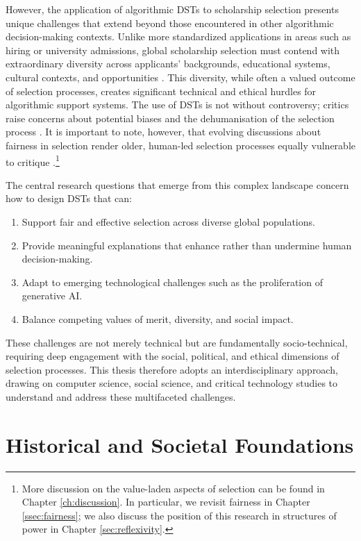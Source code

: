 However, the application of algorithmic DSTs to scholarship selection presents unique challenges that extend beyond those encountered in other algorithmic decision-making contexts. Unlike more standardized applications in areas such as hiring or university admissions, global scholarship selection must contend with extraordinary diversity across applicants' backgrounds, educational systems, cultural contexts, and opportunities \cite{Warikoo_2019}. This diversity, while often a valued outcome of selection processes, creates significant technical and ethical hurdles for algorithmic support systems. The use of DSTs is not without controversy; critics raise concerns about potential biases \cite{dwork_fairness_2012} and the dehumanisation of the selection process \cite{binns_its_2018}. It is important to note, however, that evolving discussions about fairness in selection render older, human-led selection processes equally vulnerable to critique \cite{Ahnaf2023AHPAP,pmlr-v80-kearns18a}.\footnote{More discussion on the value-laden aspects of selection can be found in Chapter \ref{ch:discussion}. In particular, we revisit fairness in Chapter \ref{ssec:fairness}; we also discuss the position of this research in structures of power in Chapter \ref{sec:reflexivity}.}

The central research questions that emerge from this complex landscape concern how to design DSTs that can:
\begin{enumerate}
  \item Support fair and effective selection across diverse global populations.
  \item Provide meaningful explanations that enhance rather than undermine human decision-making.
  \item Adapt to emerging technological challenges such as the proliferation of generative AI.
  \item Balance competing values of merit, diversity, and social impact.
\end{enumerate}

These challenges are not merely technical but are fundamentally socio-technical, requiring deep engagement with the social, political, and ethical dimensions of selection processes. This thesis therefore adopts an interdisciplinary approach, drawing on computer science, social science, and critical technology studies to understand and address these multifaceted challenges.

\section{Historical and Societal Foundations}\label{sec:context_historical_societal}

